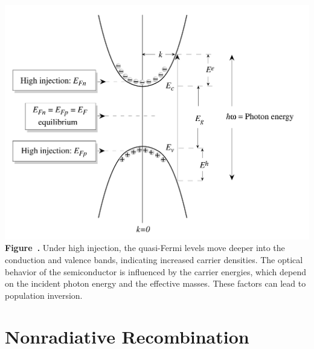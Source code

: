 \begin{center}
	\begin{minipage}{0.70\textwidth}
		\centering
		\includegraphics[width=\textwidth]{img/position_quasifermi.png}
		\\[0.5em]
		\textbf{Figure~\thefigure.} Under high injection, the quasi-Fermi levels move deeper into the conduction and valence bands, indicating increased carrier densities. The optical behavior of the semiconductor is influenced by the carrier energies, which depend on the incident photon energy and the effective masses. These factors can lead to population inversion.
		\label{fig:position_quasifermi}
	\end{minipage}
\end{center}


\section{Nonradiative Recombination}
